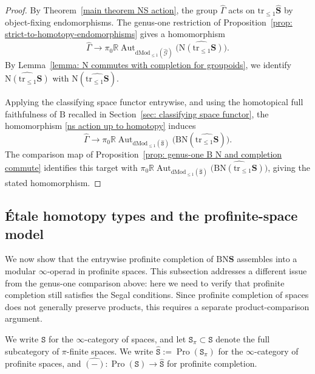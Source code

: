 \documentclass{amsart}
\newcommand{\bS}{\mathbf{S}}
\newcommand{\isSet}{\mathtt{S}}
\newcommand{\Grpd}{\mathscr{G}}
\newcommand{\dMod}{\mathrm{dMod}}
\newcommand{\Pro}{\operatorname{Pro}}
\newcommand{\cs}{\mathrm{B}}
\newcommand{\nerve}{\mathrm{N}}
\newcommand{\Aut}{\operatorname{Aut}}
\newcommand{\trun}[1]{\mathrm{tr}_{\leq{#1}}}
\newcommand{\NS}{\widehat{\mathsf{\Gamma}}}
\theoremstyle{definition}
\numberwithin{equation}{section}
\begin{document}
\begin{proof}
By Theorem~\ref{main theorem NS action}, the group $\NS$ acts on $\trun{1}\widehat{\bS}$ by object-fixing endomorphisms. The genus-one restriction of Proposition~\ref{prop: strict-to-homotopy-endomorphisms} gives a homomorphism
\begin{equation}\label{ns action up to homotopy}
{\NS}\longrightarrow
\pi_0\mathbb R\Aut_{\dMod_{\leq 1}(\widehat{\Grpd})}
\bigl(\widehat{\nerve(\trun{1}\bS)}\bigr).
\end{equation}
By Lemma~\ref{lemma: N commutes with completion for groupoids}, we identify $\widehat{\nerve(\trun{1}\bS)}$ with $\nerve(\widehat{\trun{1}\bS})$.

Applying the classifying space functor entrywise, and using the homotopical full faithfulness of $\cs$ recalled in Section~\ref{sec: classifying space functor}, the homomorphism \eqref{ns action up to homotopy} induces
\[
{\NS}\longrightarrow
\pi_0\mathbb R\Aut_{\dMod_{\leq 1}(\widehat{\isSet})}
\bigl(\cs\nerve(\widehat{\trun{1}\bS})\bigr).
\]
The comparison map of Proposition~\ref{prop: genus-one B N and completion commute} identifies this target with
$\pi_0\mathbb R\Aut_{\dMod_{\leq 1}(\widehat{\isSet})}
\bigl(\widehat{\cs\nerve(\trun{1}\bS)}\bigr)$,
giving the stated homomorphism.
\end{proof}

\subsection{Étale homotopy types and the profinite-space model}\label{sec: tower of etale homotopy types}
We now show that the entrywise profinite completion of $\cs\nerve\bS$ assembles into a modular $\infty$-operad in profinite spaces. This subsection addresses a different issue from the genus-one comparison above: here we need to verify that profinite completion still satisfies the Segal conditions. Since profinite completion of spaces does not generally preserve products, this requires a separate product-comparison argument.

We write $\isSet$ for the $\infty$-category of spaces, and let $\isSet_{\pi}\subset \isSet$ denote the full subcategory of $\pi$-finite spaces. We write $\widehat{\isSet}:=\Pro(\isSet_{\pi})$ for the $\infty$-category of profinite spaces, and
$\widehat{(-)}\colon \Pro(\isSet)\to\widehat{\isSet}$ for profinite completion.
\end{document}
